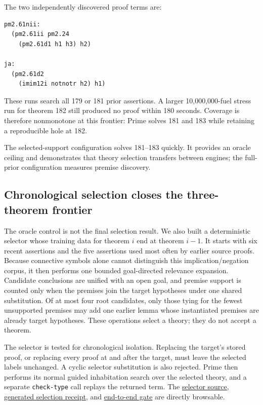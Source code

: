 \documentclass[10pt]{article}
\begin{document}
The two independently discovered proof terms are:

\begin{lstlisting}
pm2.61nii:
  (pm2.61ii pm2.24
    (pm2.61d1 h1 h3) h2)

ja:
  (pm2.61d2
    (imim12i notnotr h2) h1)
\end{lstlisting}

These runs search all 179 or 181 prior assertions.  A larger
10,000,000-fuel stress run for theorem 182 still produced no proof within 180
seconds.  Coverage is therefore nonmonotone at this frontier: Prime solves 181
and 183 while retaining a reproducible hole at 182.

The selected-support configuration solves 181--183 quickly.  It provides an
oracle ceiling and demonstrates that theory selection transfers between
engines; the full-prior configuration measures premise discovery.

\subsection{Chronological selection closes the three-theorem frontier}

The oracle control is not the final selection result.  We also built a
deterministic selector whose training data for theorem $i$ end at theorem
$i-1$.  It starts with six recent assertions and the five assertions used most
often by earlier source proofs.  Because connective symbols alone cannot
distinguish this implication/negation corpus, it then performs one bounded
goal-directed relevance expansion.  Candidate conclusions are unified with
an open goal, and premise support is counted only when the premises join the
target hypotheses under one shared substitution.  Of at most four root
candidates, only those tying for the fewest unsupported premises may add one
earlier lemma whose instantiated premises are already target hypotheses.
These operations select a theory; they do not accept a theorem.

The selector is tested for chronological isolation.  Replacing the target's
stored proof, or replacing every proof at and after the target, must leave the
selected labels unchanged.  A cyclic selector substitution is also rejected.
Prime then performs its normal guided inhabitation search over the selected
theory, and a separate \texttt{check-type} call replays the returned term.
The
\href{https://github.com/zariuq/MeTTapedia/blob/prime-atp-pcxp-20260718/MettaKernel/kernel/pcxp_trace_certification/setmm_prime_chronological_tools.py}
{selector source},
\href{https://github.com/zariuq/MeTTapedia/blob/prime-atp-pcxp-20260718/MettaKernel/kernel/pcxp_trace_certification/setmm_prime_chronological_selection_v0.json}
{generated selection receipt}, and
\href{https://github.com/zariuq/MeTTapedia/blob/prime-atp-pcxp-20260718/MettaKernel/kernel/pcxp_trace_certification/run_setmm_prime_chronological_v0_gate.sh}
{end-to-end gate} are directly browsable.
\end{document}

